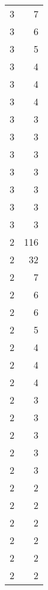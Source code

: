 \begin{tabular}{rr}
                  3 &             7 \\
                  3 &             6 \\
                  3 &             5 \\
                  3 &             4 \\
                  3 &             4 \\
                  3 &             4 \\
                  3 &             3 \\
                  3 &             3 \\
                  3 &             3 \\
                  3 &             3 \\
                  3 &             3 \\
                  3 &             3 \\
                  3 &             3 \\
                  2 &           116 \\
                  2 &            32 \\
                  2 &             7 \\
                  2 &             6 \\
                  2 &             6 \\
                  2 &             5 \\
                  2 &             4 \\
                  2 &             4 \\
                  2 &             4 \\
                  2 &             3 \\
                  2 &             3 \\
                  2 &             3 \\
                  2 &             3 \\
                  2 &             3 \\
                  2 &             2 \\
                  2 &             2 \\
                  2 &             2 \\
                  2 &             2 \\
                  2 &             2 \\
                  2 &             2 \\

\end{tabular}
